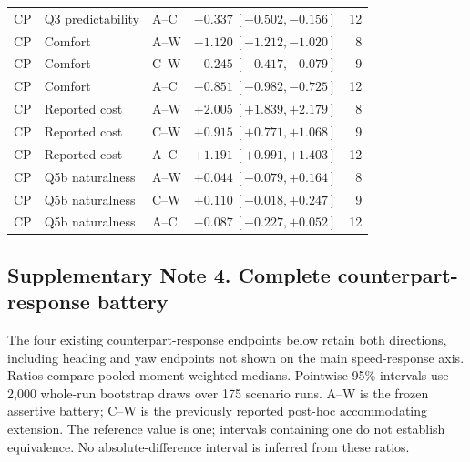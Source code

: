 \begin{longtable}{lllrr}
CP & Q3 predictability & A--C & $-0.337\ [-0.502,-0.156]$ & 12 \\
CP & Comfort & A--W & $-1.120\ [-1.212,-1.020]$ & 8 \\
CP & Comfort & C--W & $-0.245\ [-0.417,-0.079]$ & 9 \\
CP & Comfort & A--C & $-0.851\ [-0.982,-0.725]$ & 12 \\
CP & Reported cost & A--W & $+2.005\ [+1.839,+2.179]$ & 8 \\
CP & Reported cost & C--W & $+0.915\ [+0.771,+1.068]$ & 9 \\
CP & Reported cost & A--C & $+1.191\ [+0.991,+1.403]$ & 12 \\
CP & Q5b naturalness & A--W & $+0.044\ [-0.079,+0.164]$ & 8 \\
CP & Q5b naturalness & C--W & $+0.110\ [-0.018,+0.247]$ & 9 \\
CP & Q5b naturalness & A--C & $-0.087\ [-0.227,+0.052]$ & 12 \\
\end{longtable}
\endgroup


\clearpage

\subsection*{Supplementary Note 4. Complete counterpart-response battery}

The four existing counterpart-response endpoints below retain both directions, including heading and yaw endpoints not shown on the main speed-response axis. Ratios compare pooled moment-weighted medians. Pointwise 95\% intervals use 2,000 whole-run bootstrap draws over 175 scenario runs. A--W is the frozen assertive battery; C--W is the previously reported post-hoc accommodating extension. The reference value is one; intervals containing one do not establish equivalence. No absolute-difference interval is inferred from these ratios.

